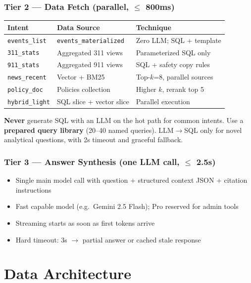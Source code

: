 \documentclass[11pt,a4paper]{article}
\begin{document}
\subsubsection{Tier 2 --- Data Fetch (parallel, $\leq$ 800ms)}
\begin{table}[h]
\centering
\small
\begin{tabular}{@{}lll@{}}
\toprule
\textbf{Intent} & \textbf{Data Source} & \textbf{Technique} \\
\midrule
\texttt{events\_list} & \texttt{events\_materialized} & Zero LLM; SQL + template \\
\texttt{311\_stats} & Aggregated 311 views & Parameterized SQL only \\
\texttt{911\_stats} & Aggregated 911 views & SQL + safety copy rules \\
\texttt{news\_recent} & Vector + BM25 & Top-$k$=8, parallel sources \\
\texttt{policy\_doc} & Policies collection & Higher $k$, rerank top 5 \\
\texttt{hybrid\_light} & SQL slice + vector slice & Parallel execution \\
\bottomrule
\end{tabular}
\end{table}

\textbf{Never} generate SQL with an LLM on the hot path for common intents. Use a \textbf{prepared query library} (20--40 named queries). LLM$\rightarrow$SQL only for novel analytical questions, with 2s timeout and graceful fallback.

\subsubsection{Tier 3 --- Answer Synthesis (one LLM call, $\leq$ 2.5s)}
\begin{itemize}[noitemsep]
  \item Single main model call with question + structured context JSON + citation instructions
  \item Fast capable model (e.g.\ Gemini 2.5 Flash); Pro reserved for admin tools
  \item Streaming starts as soon as first tokens arrive
  \item Hard timeout: 3s $\rightarrow$ partial answer or cached stale response
\end{itemize}

\section{Data Architecture}
\end{document}
